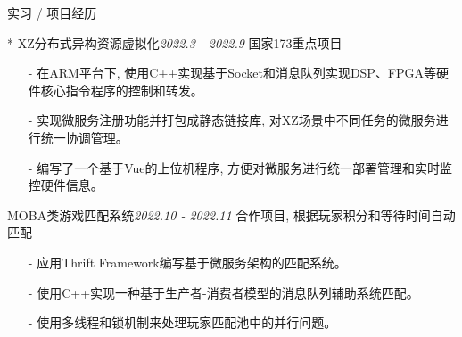 \documentclass{resume} %
\begin{document}
\begin{rSection}{实习 / 项目经历}

\begin{rSubsection}{* XZ分布式异构资源虚拟化}{\em 2022.3 - 2022.9}
{国家173重点项目}
{}
\item[]
    \begin{itemize}
    \setlength\itemsep{-0.5em}
        \item[-] 在ARM平台下, 使用C++实现基于Socket和消息队列实现DSP、FPGA等硬件核心指令程序的控制和转发。
        \item[-] 实现微服务注册功能并打包成静态链接库, 对XZ场景中不同任务的微服务进行统一协调管理。
        \item[-] 编写了一个基于Vue的上位机程序, 方便对微服务进行统一部署管理和实时监控硬件信息。
    \end{itemize}
\end{rSubsection}


\begin{rSubsection}{MOBA类游戏匹配系统}{\em 2022.10 - 2022.11}
{合作项目, 根据玩家积分和等待时间自动匹配}
{}
    \item[]
    \begin{itemize}
    \setlength\itemsep{-0.5em}
        \item[-] 应用Thrift Framework编写基于微服务架构的匹配系统。
        \item[-] 使用C++实现一种基于生产者-消费者模型的消息队列辅助系统匹配。
        \item[-] 使用多线程和锁机制来处理玩家匹配池中的并行问题。
    \end{itemize}
\end{rSubsection}

\end{rSection}
\end{document}
